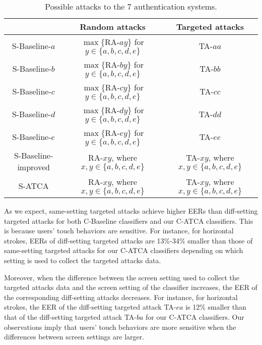 \documentclass{sig-alternate-05-2015}
\begin{document}
\begin{table*}[!t]\renewcommand{\arraystretch}{1}
\centering
\caption{Possible attacks to the 7  authentication systems.}
\addtolength{\tabcolsep}{-3pt}
\begin{tabular}{|c|c|c|} \hline
 & {\small Random attacks} & {\small Targeted attacks} \\ \hline
{\small S-Baseline-$a$} & {\small $\max\{\text{RA-}ay\}$ for $y\in \{a,b,c,d,e\}$} & {\small TA-$aa$} \\ \hline
{\small S-Baseline-$b$} & {\small $\max\{\text{RA-}by\}$ for $y\in \{a,b,c,d,e\}$} & {\small TA-$bb$} \\ \hline
{\small S-Baseline-$c$} & {\small $\max\{\text{RA-}cy\}$ for $y\in \{a,b,c,d,e\}$} & {\small TA-$cc$} \\ \hline
{\small S-Baseline-$d$} & {\small $\max\{\text{RA-}dy\}$ for $y\in \{a,b,c,d,e\}$} & {\small TA-$dd$} \\ \hline
{\small S-Baseline-$e$} & {\small $\max\{\text{RA-}ey\}$ for $y\in \{a,b,c,d,e\}$} & {\small TA-$ee$} \\ \hline
{\small S-Baseline-improved} & {\small RA-$xy$, where $x,y\in \{a,b,c,d,e\}$} & {\small TA-$xy$, where $x,y\in \{a,b,c,d,e\}$} \\ \hline
{\small S-ATCA} & {\small RA-$xy$, where $x,y\in \{a,b,c,d,e\}$} & {\small TA-$xy$, where $x,y\in \{a,b,c,d,e\}$} \\ \hline
\end{tabular}
\label{attacks}
\end{table*}

As we expect, same-setting targeted attacks achieve
higher EERs than diff-setting targeted attacks for both C-Baseline classifiers
 and our C-ATCA classifiers. This is because  users' touch behaviors are sensitive.
 For instance, for horizontal strokes,
 EERs of diff-setting targeted attacks are 13\%-34\% smaller than those of  
same-setting targeted attacks for our C-ATCA classifiers depending on which setting
is used to collect the targeted attacks data. 

Moreover, when the difference between the screen setting used to collect 
the targeted attacks data and the screen setting of the classifier increases, 
the EER of the corresponding diff-setting attacks decreases. For instance, for horizontal
strokes,
 the EER of the diff-setting targeted attack TA-$ea$ is 12\% smaller than that of 
the diff-setting targeted attack TA-$ba$ for our C-ATCA classifiers. Our observations imply that users'
touch behaviors are more sensitive when the differences between screen settings are larger. 
  
\end{document}
